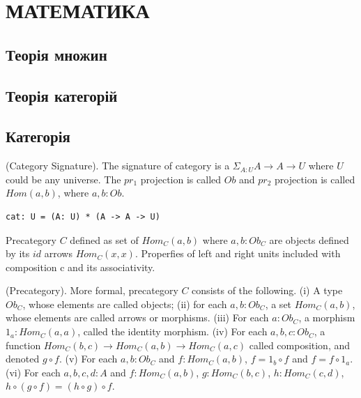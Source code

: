 \chapter{МАТЕМАТИКА}

\section{Теорія множин}
\section{Теорія категорій}

\section{Категорія}

\begin{definition} (Category Signature).
The signature of category is
a $\Sigma_{A:U}A \rightarrow A \rightarrow U$ where $U$ could be any universe.
The $pr_1$ projection is called $Ob$ and $pr_2$ projection is
called $Hom(a,b)$, where $a,b:Ob$.
\begin{lstlisting}
cat: U = (A: U) * (A -> A -> U)
\end{lstlisting}
\end{definition}

Precategory $C$ defined as set of $Hom_C(a,b)$ where $a,b:Ob_C$
are objects defined by its $id$ arrows $Hom_C(x,x)$.
Properfies of left and right units included with composition c
and its associativity.

\begin{definition} (Precategory).
More formal, precategory $C$ consists of the following.
(i) A type $Ob_C$, whose elements are called objects;
(ii) for each $a,b: Ob_C$, a set $Hom_C(a,b)$, whose
elements are called arrows or morphisms.
(iii) For each $a: Ob_C$, a morphism $1_a : Hom_C(a,a)$,
called the identity morphism.
(iv) For each $a,b,c: Ob_C$, a function
$Hom_C(b,c) \rightarrow Hom_C(a,b) \rightarrow Hom_C(a,c)$
called composition, and denoted $g \circ f$.
(v) For each $a,b: Ob_C$ and $f: Hom_C(a,b)$,
$f = 1_b \circ f$ and $f = f \circ 1_a$.
(vi) For each $a,b,c,d: A$ and
$f: Hom_C(a,b)$, $g: Hom_C(b,c)$, $h: Hom_C(c,d)$,
$h \circ (g \circ f ) = (h \circ g) \circ f$.
\end{definition}

